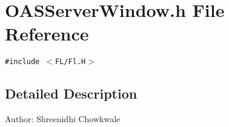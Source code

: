 \section{OASServer\-Window.h File Reference}
\label{OASServerWindow_8h}
{\tt \#include $<$FL/Fl.H$>$}\par


\subsection{Detailed Description}
\begin{Desc}
\item[Author:]Shreenidhi Chowkwale \end{Desc}
